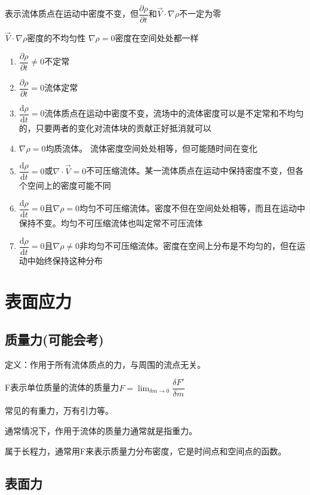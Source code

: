 \documentclass[a4paper,oneside]{ctexbook}
\begin{document}
表示流体质点在运动中密度不变，但\(\dfrac{\partial{\rho}}{\partial{t}}\)和\(\overrightarrow{V}\cdot\nabla\rho\)不一定为零

\(\overrightarrow{V}\cdot\nabla\rho\)密度的不均匀性 \(\nabla\rho=0\)密度在空间处处都一样
\begin{enumerate}
    \item \(\dfrac{\partial{\rho}}{\partial{t}}\neq0\)不定常
    \item \(\dfrac{\partial{\rho}}{\partial{t}}=0\)流体定常
    \item \(\dfrac{\mathrm{d}\rho}{\mathrm{d}t}=0\)流体质点在运动中密度不变，流场中的流体密度可以是不定常和不均匀的，只要两者的变化对流体块的贡献正好抵消就可以
    \item \(\nabla\rho=0\)均质流体。 流体密度空间处处相等，但可能随时间在变化
    \item \(\dfrac{\mathrm{d}\rho}{\mathrm{d}t}=0\)或\(\nabla\cdot\overrightarrow{V}=0\)不可压缩流体。某一流体质点在运动中保持密度不变，但各个空间上的密度可能不同
    \item \(\dfrac{\mathrm{d}\rho}{\mathrm{d}t}=0\)且\(\nabla\rho=0\)均匀不可压缩流体。密度不但在空间处处相等，而且在运动中保持不变。均匀不可压缩流体也叫定常不可压流体
    \item \(\dfrac{\mathrm{d}\rho}{\mathrm{d}t}=0\)且\(\nabla\rho\neq0\)非均匀不可压缩流体。密度在空间上分布是不均匀的，但在运动中始终保持这种分布
\end{enumerate}

\section{表面应力}

\subsection{质量力(可能会考)}

定义：作用于所有流体质点的力，与周围的流点无关。

F表示单位质量的流体的质量力\(F=\lim_{\delta{m}\to0}\limits\dfrac{\delta{F}'}{\delta{m}}\)

常见的有重力，万有引力等。

通常情况下，作用于流体的质量力通常就是指重力。

属于长程力，通常用F来表示质量力分布密度，它是时间点和空间点的函数。

\subsection{表面力}
\end{document}
